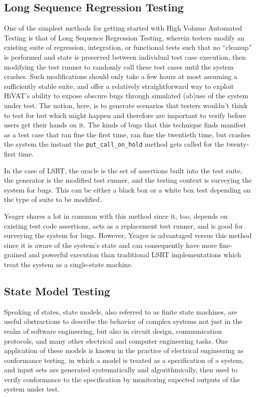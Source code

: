 \subsection{Long Sequence Regression Testing}
One of the simplest methods for getting started with High Volume Automated Testing is that of Long Sequence Regression Testing, wherein testers modify an existing suite of regression, integration, or functional tests such that no ``cleanup'' is performed and state is preserved between individual test case execution, then modifying the test runner to randomly call these test cases until the system crashes. Such modifications should only take a few hours at most assuming a sufficiently stable suite, and offer a relatively straightforward way to exploit HiVAT's ability to expose obscure bugs through simulated (ab)use of the system under test. The notion, here, is to generate scenarios that testers wouldn't think to test for but which might happen and therefore are important to verify before users get their hands on it. The kinds of bugs that this technique finds manifest as a test case that ran fine the first time, ran fine the twentieth time, but crashes the system the instant the \texttt{put\_call\_on\_hold} method gets called for the twenty-first time.

In the case of LSRT, the oracle is the set of assertions built into the test suite, the generator is the modified test runner, and the testing context is surveying the system for bugs. This can be either a black box or a white box test depending on the type of suite to be modified.

Yeager shares a lot in common with this method since it, too, depends on existing test code assertions, acts as a replacement test runner, and is good for surveying the system for bugs. However, Yeager is advantaged versus this method since it is aware of the system's state and can consequently have more fine-grained and powerful execution than traditional LSRT implementations which treat the system as a single-state machine.

\subsection{State Model Testing}
Speaking of states, state models, also referred to as finite state machines, are useful abstractions to describe the behavior of complex systems not just in the realm of software engineering, but also in circuit design, communication protocols, and many other electrical and computer engineering tasks. One application of these models is known in the practice of electrical engineering as conformance testing, in which a model is treated as a specification of a system, and input sets are generated systematically and algorithmically, then used to verify conformance to the specification by monitoring expected outputs of the system under test.\citep{lee1996principles}

